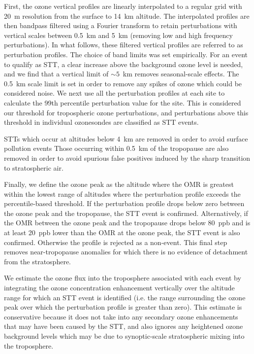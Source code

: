 \documentclass{article}
\begin{document}
    First, the ozone vertical profiles are linearly interpolated to a regular grid with 20~m resolution from the surface to 14~km altitude. 
    The interpolated profiles are then bandpass filtered using a Fourier transform to retain perturbations with vertical scales between 0.5~km and 5~km (removing low and high frequency perturbations).
    In what follows, these filtered vertical profiles are referred to as perturbation profiles.
    The choice of band limits was set empirically. 
    For an event to qualify as STT, a clear increase above the background ozone level is needed, and we find that a vertical limit of $\sim 5$~km removes seasonal-scale effects.
    The 0.5~km scale limit is set in order to remove any spikes of ozone which could be considered noise.
    We next use all the perturbation profiles at each site to calculate the 99th percentile perturbation value for the site.
    This is considered our threshold for tropospheric ozone perturbations, and perturbations above this threshold in individual ozonesondes are classified as STT events.
    
    STTs which occur at altitudes below 4~km are removed in order to avoid surface pollution events
    Those occurring within 0.5~km of the tropopause are also removed in order to avoid spurious false positives induced by the sharp transition to stratospheric air.
    
    Finally, we define the ozone peak as the altitude where the OMR is greatest within the lowest range of altitudes where the perturbation profile exceeds the percentile-based threshold.
    If the perturbation profile drops below zero between the ozone peak and the tropopause, the STT event is confirmed. 
    Alternatively, if the OMR between the ozone peak and the tropopause drops below 80~ppb and is at least 20~ppb lower than the OMR at the ozone peak, the STT event is also confirmed. 
    Otherwise the profile is rejected as a non-event.
    This final step removes near-tropopause anomalies for which there is no evidence of detachment from the stratosphere.

    We estimate the ozone flux into the troposphere associated with each event by integrating the ozone concentration enhancement vertically over the altitude range for which an STT event is identified (i.e. the range surrounding the ozone peak over which the perturbation profile is greater than zero).
    This estimate is conservative because it does not take into any secondary ozone enhancements that may have been caused by the STT, and also ignores any heightened ozone background levels which may be due to synoptic-scale stratospheric mixing into the troposphere.
    
\end{document}
